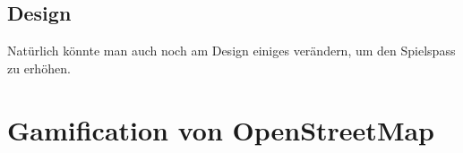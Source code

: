 \subsection{Design}
Natürlich könnte man auch noch am Design einiges verändern, um den Spielspass zu erhöhen.

\section{Gamification von OpenStreetMap}
